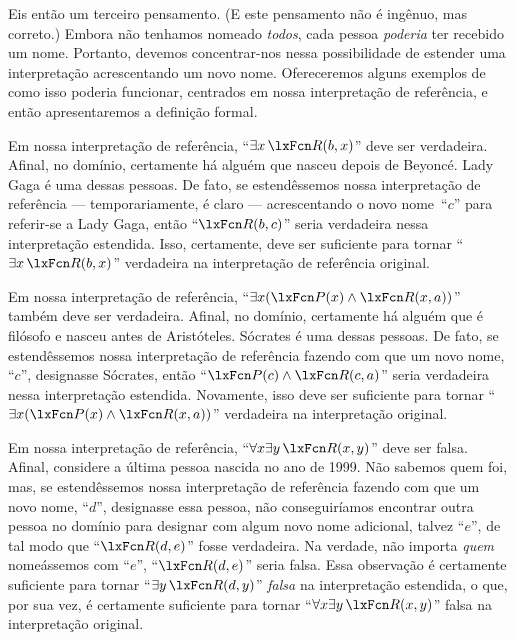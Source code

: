 Eis então um terceiro pensamento. (E este pensamento não é ingênuo, mas correto.) Embora não tenhamos nomeado \emph{todos}, cada pessoa \emph{poderia} ter recebido um nome. Portanto, devemos concentrar-nos nessa possibilidade de estender uma interpretação acrescentando um novo nome. Ofereceremos alguns exemplos de como isso poderia funcionar, centrados em nossa interpretação de referência, e então apresentaremos a definição formal.

Em nossa interpretação de referência, \textquotedblleft $\exists x\, \atom{R}{b,x}$\textquotedblright{} deve ser verdadeira. Afinal, no domínio, certamente há alguém que nasceu depois de Beyonc\'e. Lady Gaga é uma dessas pessoas. De fato, se estendêssemos nossa interpretação de referência — temporariamente, é claro — acrescentando o novo nome~\textquotedblleft $c$\textquotedblright{} para referir-se a Lady Gaga, então \textquotedblleft $\atom{R}{b,c}$\textquotedblright{} seria verdadeira nessa interpretação estendida. Isso, certamente, deve ser suficiente para tornar \textquotedblleft $\exists x\, \atom{R}{b,x}$\textquotedblright{} verdadeira na interpretação de referência original.

Em nossa interpretação de referência, \textquotedblleft $\exists x (\atom{P}{x} \eand \atom{R}{x,a})$\textquotedblright{} também deve ser verdadeira. Afinal, no domínio, certamente há alguém que é filósofo e nasceu antes de Aristóteles. Sócrates é uma dessas pessoas. De fato, se estendêssemos nossa interpretação de referência fazendo com que um novo nome, \textquotedblleft $c$\textquotedblright{}, designasse Sócrates, então \textquotedblleft $\atom{P}{c} \eand \atom{R}{c,a}$\textquotedblright{} seria verdadeira nessa interpretação estendida. Novamente, isso deve ser suficiente para tornar \textquotedblleft $\exists x (\atom{P}{x} \eand \atom{R}{x,a})$\textquotedblright{} verdadeira na interpretação original.

Em nossa interpretação de referência, \textquotedblleft $\forall x \exists y\, \atom{R}{x,y}$\textquotedblright{} deve ser falsa. Afinal, considere a última pessoa nascida no ano de 1999. Não sabemos quem foi, mas, se estendêssemos nossa interpretação de referência fazendo com que um novo nome, \textquotedblleft $d$\textquotedblright{}, designasse essa pessoa, não conseguiríamos encontrar outra pessoa no domínio para designar com algum novo nome adicional, talvez \textquotedblleft $e$\textquotedblright{}, de tal modo que \textquotedblleft $\atom{R}{d,e}$\textquotedblright{} fosse verdadeira. Na verdade, não importa \emph{quem} nomeássemos com \textquotedblleft $e$\textquotedblright{}, \textquotedblleft $\atom{R}{d,e}$\textquotedblright{} seria falsa. Essa observação é certamente suficiente para tornar \textquotedblleft $\exists y\, \atom{R}{d,y}$\textquotedblright{} \emph{falsa} na interpretação estendida, o que, por sua vez, é certamente suficiente para tornar \textquotedblleft $\forall x \exists y\, \atom{R}{x,y}$\textquotedblright{} falsa na interpretação original.

